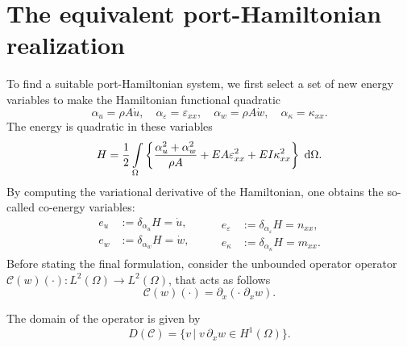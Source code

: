 \documentclass{ifacconf}
\begin{document}
\section{The equivalent port-Hamiltonian realization}\label{sec:pHmodel}
To find a suitable port-Hamiltonian system, we first select a set of new energy variables to make the Hamiltonian functional quadratic
\begin{equation}\label{eq:energies}
	\alpha_u = \rho A \dot{u}, \quad \alpha_\varepsilon = \varepsilon_{xx}, \quad \alpha_w = \rho A \dot{w}, \quad \alpha_\kappa = \kappa_{xx}.
\end{equation}
The energy is quadratic in these variables
\begin{equation}
	H = \frac{1}{2} \int_{\Omega} \left\{\frac{\alpha_u^2 + \alpha_w^2}{\rho A} + EA \varepsilon_{xx}^2 + EI \kappa_{xx}^2 \right\} \d{\Omega}.
\end{equation}
By computing the variational derivative of the Hamiltonian, one obtains the so-called co-energy variables:
\begin{equation}\label{eq:coenergies}
	\begin{aligned}
	e_u &:= \delta_{\alpha_u} H = \dot{u}, \\
	e_w &:= \delta_{\alpha_w} H = \dot{w}, \\
	\end{aligned} \qquad 
\begin{aligned}
	e_\varepsilon &:= \delta_{\alpha_\varepsilon} H = n_{xx}, \\ e_\kappa &:= \delta_{\alpha_\kappa} H = m_{xx}.
\end{aligned}
\end{equation}
Before stating the final formulation, consider the unbounded operator operator $\mathcal{C}(w)(\cdot): L^2(\Omega) \rightarrow L^2(\Omega)$, that acts as follows
\begin{equation}
	\mathcal{C}(w)(\cdot ) = \partial_x(\cdot \; \partial_x w).
\end{equation}

The domain of the operator is given by
\begin{equation}
D(\mathcal{C}) = \{v \, \vert \; v \, \partial_x w \in H^1(\Omega) \}.
\end{equation}
\end{document}
